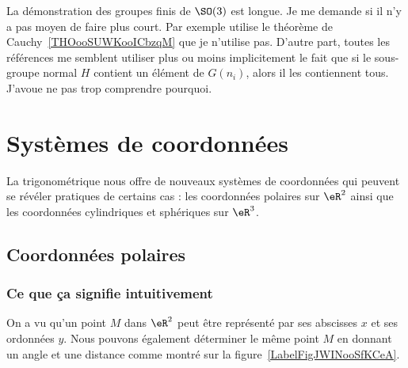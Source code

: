 \begin{probleme}
    La démonstration des groupes finis de \( \SO(3)\) est longue. Je me demande si il n'y a pas moyen de faire plus court. Par exemple \cite{ooYODPooHeNKiQ} utilise le théorème de Cauchy~\ref{THOooSUWKooICbzqM} que je n'utilise pas. D'autre part, toutes les références me semblent utiliser plus ou moins implicitement le fait que si le sous-groupe normal \( H\) contient un élément de \( G(n_i)\), alors il les contiennent tous. J'avoue ne pas trop comprendre pourquoi.
\end{probleme}

\section{Systèmes de coordonnées}
\label{SECooWTPRooZbOSzO}

La trigonométrique nous offre de nouveaux systèmes de coordonnées qui peuvent se révéler pratiques de certains cas : les coordonnées polaires sur \( \eR^2\) ainsi que les coordonnées cylindriques et sphériques sur \( \eR^3\).

\subsection{Coordonnées polaires}

\subsubsection{Ce que ça signifie intuitivement}

On a vu qu'un point $M$ dans $\eR^2$ peut être représenté par ses abscisses $x$ et ses ordonnées $y$. Nous pouvons également déterminer le même point $M$ en donnant un angle et une distance comme montré sur la figure~\ref{LabelFigJWINooSfKCeA}.
\newcommand{\CaptionFigJWINooSfKCeA}{Un point en coordonnées polaires est donné par sa distance à l'origine et par l'angle qu'il faut avec l'horizontale.}



